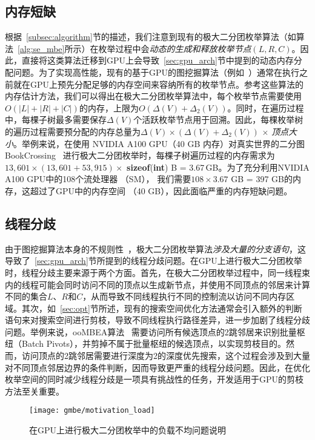\subsection{内存短缺}
根据~\ref{subsec:algorithm}节的描述，我们注意到现有的极大二分团枚举算法（如算法~\ref{alg:se_mbe}所示）在枚举过程中会\emph{动态的生成和释放枚举节点$(L,R,C)$}。因此，直接将这类算法迁移到GPU上会导致~\ref{sec:gpu_arch}节中提到的动态内存分配问题。为了实现高性能，现有的基于GPU的图挖掘算法（例如~\cite{MCE-GPU21,Kclique22,g2miner22,Graphset23}）通常在执行之前就在GPU上预先分配足够的内存空间来容纳所有的枚举节点。参考这些算法的内存估计方法，我们可以得出在极大二分团枚举算法中，每个枚举节点需要使用$O(|L|+|R|+|C|)$的内存，上限为$O(\Delta(V) + \Delta_2(V))$。同时，在遍历过程中，每棵子树最多需要保存$\Delta(V)$个活跃枚举节点用于回溯。因此，每棵枚举树的遍历过程需要预分配的内存总量为$\Delta(V) \times (\Delta(V) + \Delta_2(V))$ $\times$ \textit{顶点大小}。举例来说，在使用 NVIDIA A100 GPU（40 GB 内存）对真实世界的二分图 BookCrossing~\cite{konect} 进行极大二分团枚举时，每棵子树遍历过程的内存需求为$13,601 \times (13,601 + 53,915) \times$ \textbf{sizeof}(\textbf{int}) B = 3.67\,GB。为了充分利用NVIDIA A100 GPU中的108个流处理器 （SM）， 我们需要$108 \times 3.67$ GB = 397 GB的内存，这超过了GPU中的内存空间 （40 GB），因此面临严重的内存短缺问题。

\subsection{线程分歧}
\label{subsec:gmbe_thread_divergence}

由于图挖掘算法本身的不规则性~\cite{Irregularity12}，极大二分团枚举算法\emph{涉及大量的分支语句}，这导致了~\ref{sec:gpu_arch}节所提到的线程分歧问题。在GPU上进行极大二分团枚举时，线程分歧主要来源于两个方面。首先，在极大二分团枚举过程中，同一线程束内的线程可能会同时访问不同的顶点以生成新节点，并使用不同顶点的邻居来计算不同的集合$L$、$R$和$C$，从而导致不同线程执行不同的控制流以访问不同内存区域。其次，如~\ref{sec:opt}节所述，现有的搜索空间优化方法通常会引入额外的判断语句来对搜索空间进行剪枝，导致不同线程执行路径差异，进一步加剧了线程分歧问题。举例来说，ooMBEA算法~\cite{ooMBE22} 需要访问所有候选顶点的2跳邻居来识别批量枢纽（Batch Pivots），并剪掉不属于批量枢纽的候选顶点，以实现剪枝目的。然而，访问顶点的2跳邻居需要进行深度为2的深度优先搜索，这个过程会涉及到大量对不同顶点邻居边界的条件判断，因而导致更严重的线程分歧问题。因此，在优化枚举空间的同时减少线程分歧是一项具有挑战性的任务，开发适用于GPU的剪枝方法至关重要。

\begin{figure} [H]
  \center
    \vspace{0.1in}
		\texttt{[image: gmbe/motivation\_load]}
    \vspace{0.1in}
	\caption{在GPU上进行极大二分团枚举中的负载不均问题说明}
	\label{fig:gmbe_load_reason}
\end{figure}


